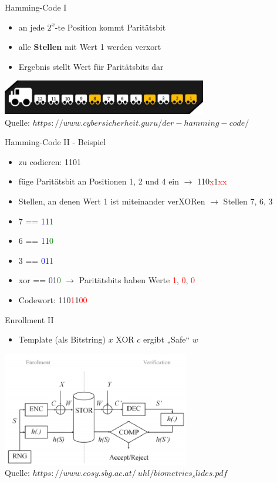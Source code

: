 \documentclass{beamer}
\begin{document}
\begin{frame}{Hamming-Code I}
	\begin{itemize}
		\item an jede $2^{x}$-te Position kommt Parit\"atsbit
		\item alle \textbf{Stellen} mit Wert 1 werden verxort
		\item Ergebnis stellt Wert für Parit\"atsbits dar
	\end{itemize}
	\vspace{10mm}\includegraphics[height=1.5cm]{hamming_zug.png}\\
	\tiny{Quelle: \textit{\tiny{$https://www.cybersicherheit.guru/der-hamming-code/$}}}
\end{frame}
\begin{frame}{Hamming-Code II - Beispiel}
	\begin{itemize}
		\item zu codieren: 1101
		\item f\"uge Parit\"atsbit an Positionen 1, 2 und 4 ein $\rightarrow$ 110\textcolor{red}{x}1\textcolor{red}{xx}
		\item Stellen, an denen Wert 1 ist miteinander verXORen $\rightarrow$ Stellen 7, 6, 3
		\item 7 	== \textcolor{blue}{1}1\textcolor{green}{1}
		\item 6 == \textcolor{blue}{1}1\textcolor{green}{0}
		\item 3 == \textcolor{blue}{0}1\textcolor{green}{1}
		\item xor == \textcolor{blue}{0}1\textcolor{green}{0} $\rightarrow$ Parit\"atsbits haben Werte \textcolor{red}{1}, \textcolor{red}{0}, \textcolor{red}{0}
		\item Codewort: 110\textcolor{red}{1}1\textcolor{red}{00}
	\end{itemize}
\end{frame}
\begin{frame}{Enrollment II}
	\begin{itemize}
		\item Template (als Bitstring) $x$ XOR $c$ ergibt „Safe“ $w$
	\end{itemize}
	\hspace{10mm}\includegraphics[height=5cm]{fcs.png}\\
	\tiny{Quelle: \textit{\tiny{$https://www.cosy.sbg.ac.at/~uhl/biometrics_slides.pdf$}}}
\end{frame}
\end{document}

